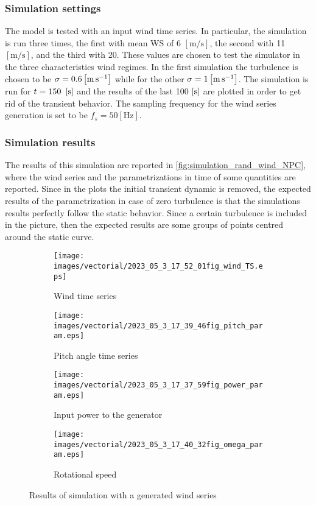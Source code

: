 \subsubsection{Simulation settings}
The model is tested with an input wind time series. In particular, the simulation is run three times, the first with mean \acrshort{WS} of 6 $\left[\si{\meter\per\second}\right]$, the second with  11 $\left[\si{\meter\per\second}\right]$, and the third with 20. These values are chosen to test the simulator in the three characteristics wind regimes. In the first simulation the turbulence is chosen to be $\sigma=0.6 \left[\si{\meter\per\second}\right]$ while for the other $\sigma=1 \left[\si{\meter\per\second}\right]$. The simulation is run for $t=150\ \mesunt{\second}$ and the results of the last 100 $\left[\si{\second}\right]$ are plotted in order to get rid of the transient behavior. The sampling frequency for the wind series generation is set to be $f_s=50 \left[\si{\hertz}\right]$.

\subsubsection{Simulation results}
The results of this simulation are reported in \autoref{fig:simulation_rand_wind_NPC}, where the wind series and the parametrizations in time of some quantities are reported. Since in the plots the initial transient dynamic is removed, the expected results of the parametrization in case of zero turbulence is that the simulations results perfectly follow the static behavior. Since a certain turbulence is included in the picture, then the expected results are some groups of points centred around the static curve.
\begin{figure}[htb]
  \begin{subfigure}{0.5\columnwidth}
    \centering
    \texttt{[image: images/vectorial/2023\_05\_3\_17\_52\_01fig\_wind\_TS.eps]}
    \caption{Wind time series}
    \label{fig:2023_05_1_00_55_48fig_wind_TS.eps}
  \end{subfigure}
  \begin{subfigure}{0.5\columnwidth}
    \centering
    \texttt{[image: images/vectorial/2023\_05\_3\_17\_39\_46fig\_pitch\_param.eps]}
    \caption{Pitch angle time series}
    \label{fig:2023_05_1_00_50_19fig_power_param}
  \end{subfigure}
  \begin{subfigure}{0.5\columnwidth}
    \centering
    \texttt{[image: images/vectorial/2023\_05\_3\_17\_37\_59fig\_power\_param.eps]}
    \caption{Input power to the generator}
    \label{fig:2023_05_1_00_51_17fig_omega_param}
  \end{subfigure}
  \begin{subfigure}{0.5\columnwidth}
    \centering
    \texttt{[image: images/vectorial/2023\_05\_3\_17\_40\_32fig\_omega\_param.eps]}
    \caption{Rotational speed}
    \label{fig:2023_05_1_00_50_58fig_pitch_param}
  \end{subfigure}
  \caption{Results of simulation with a generated wind series}
  \label{fig:simulation_rand_wind_NPC}
\end{figure}

